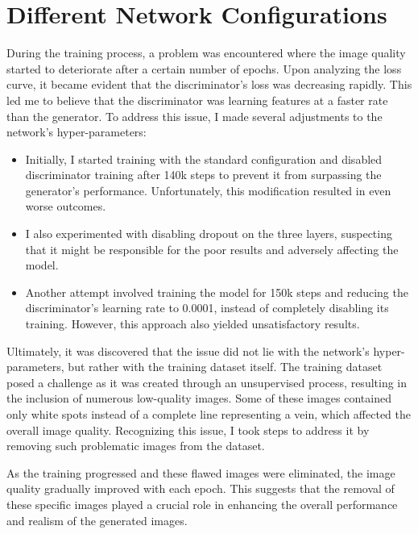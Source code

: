 \section{Different Network Configurations}\label{sec:different-network-configurations}
During the training process, a problem was encountered where the image quality started to deteriorate after a certain number of epochs. Upon analyzing the loss curve, it became evident that the discriminator's loss was decreasing rapidly. 
This led me to believe that the discriminator was learning features at a faster rate than the generator.
To address this issue, I made several adjustments to the network's hyper-parameters:
\begin{itemize}
    \item Initially, I started training with the standard configuration and disabled discriminator training after 140k steps to prevent it from surpassing the generator's performance. Unfortunately, this modification resulted in even worse outcomes.
    \item I also experimented with disabling dropout on the three layers, suspecting that it might be responsible for the poor results and adversely affecting the model.
    \item Another attempt involved training the model for 150k steps and reducing the discriminator's learning rate to 0.0001, instead of completely disabling its training. However, this approach also yielded unsatisfactory results.
\end{itemize}
Ultimately, it was discovered that the issue did not lie with the network's hyper-parameters, but rather with the training dataset itself.
The training dataset posed a challenge as it was created through an unsupervised process, resulting in the inclusion of numerous low-quality images. Some of these images contained only white spots instead of a complete line representing a vein, which affected the overall image quality. Recognizing this issue, I took steps to address it by removing such problematic images from the dataset.

As the training progressed and these flawed images were eliminated, the image quality gradually improved with each epoch. This suggests that the removal of these specific images played a crucial role in enhancing the overall performance and realism of the generated images.